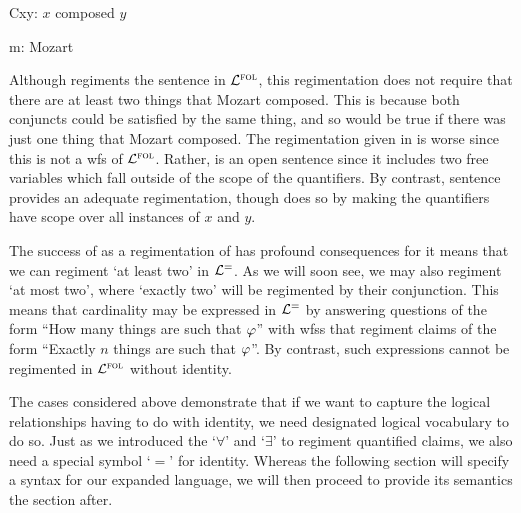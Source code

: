 \begin{multicols}{2}
  \begin{ekey}
    \item[Cxy:] $x$ composed $y$
    \item[m:] Mozart
  \end{ekey}

  \begin{earg} \label{mozart}
  \end{earg}
\end{multicols}

Although  regiments the sentence  in $\mathcal{L}^{\textsc{fol}}$, this regimentation does not require that there are at least two things that Mozart composed.
This is because both conjuncts could be satisfied by the same thing, and so  would be true if there was just one thing that Mozart composed.
The regimentation given in  is worse since this is not a wfs of $\mathcal{L}^{\textsc{fol}}$. 
Rather,  is an open sentence since it includes two free variables which fall outside of the scope of the quantifiers.
By contrast, sentence  provides an adequate regimentation, though does so by making the quantifiers have scope over all instances of $x$ and $y$. 

The success of  as a regimentation of  has profound consequences for it means that we can regiment `at least two' in $\mathcal{L}^{=}$.
As we will soon see, we may also regiment `at most two', where `exactly two' will be regimented by their conjunction.
This means that cardinality may be expressed in $\mathcal{L}^{=}$ by answering questions of the form ``How many things are such that $\varphi$'' with wfss that regiment claims of the form ``Exactly $n$ things are such that $\varphi$''.
By contrast, such expressions cannot be regimented in $\mathcal{L}^{\textsc{fol}}$ without identity.

The cases considered above demonstrate that if we want to capture the logical relationships having to do with identity, we need designated logical vocabulary to do so.
Just as we introduced the `$\forall$' and `$\exists$' to regiment quantified claims, we also need a special symbol `$=$' for identity.
Whereas the following section will specify a syntax for our expanded language, we will then proceed to provide its semantics the section after.




